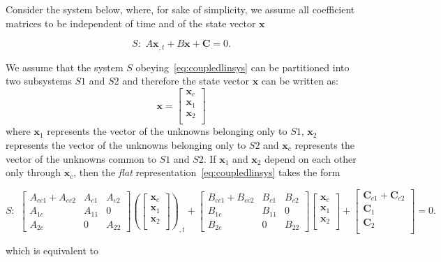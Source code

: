 \documentclass{scrartcl}
\begin{document}
Consider the system below, where, for sake of simplicity,
we assume all coefficient matrices to be independent of time and
of the state vector $\mathbf{x}$

\begin{equation}\label{eq:coupledlinsys}
S: \,\, A \mathbf{x}_{,t} + B \mathbf{x} + \mathbf{C} = 0.
\end{equation}

We assume that the system $S$ obeying~\eqref{eq:coupledlinsys} can be 
partitioned into two subsystems $S1$ and $S2$ and therefore the state 
vector $\mathbf{x}$ can be written as:
\newcommand{\xprtd}{\left[\begin{array}{c}%
\mathbf{x}_{c} \\
\mathbf{x}_{1} \\
\mathbf{x}_{2} \\
\end{array}\right]}
\begin{equation}\label{eq:staepart}
\mathbf{x} = \xprtd
\end{equation}
where $\mathbf{x}_{1}$ represents the vector of the unknowns belonging only to 
$S1$, $\mathbf{x}_{2}$ represents the vector of the unknowns belonging only to 
$S2$ and $\mathbf{x}_{c}$ represents the vector of the unknowns common to 
$S1$ and $S2$.
If $\mathbf{x}_{1}$ and $\mathbf{x}_{2}$ depend on each other only through 
$\mathbf{x}_{c}$, then the \emph{flat} representation~\eqref{eq:coupledlinsys} 
takes the form

\newcommand{\MTT}[9]{\left[
    \begin{array}{ccc}#1 & #2 & #3 \\#4 & #5 & #6 \\#7 & #8 & #9
    \end{array}
  \right]}

\begin{equation}\label{eq:partitionedcoupledlinsys}
S: \,\,  \MTT{A_{cc1}+A_{cc2}}{A_{c1}}{A_{c2}}
{A_{1c}}{A_{11}}{0}
{A_{2c}}{0}{A_{22}}
\left(\xprtd\right)_{,t} + 
\MTT{B_{cc1}+B_{cc2}}{B_{c1}}{B_{c2}}{B_{1c}}{B_{11}}{0}{B_{2c}}{0}{B_{22}}
\xprtd + \left[
  \begin{array}{c}%
    \mathbf{C}_{c1}+\mathbf{C}_{c2} \\
    \mathbf{C}_{1} \\
    \mathbf{C}_{2} \\
  \end{array}\right]
= 0.
\end{equation}

which is equivalent to
\end{document}
